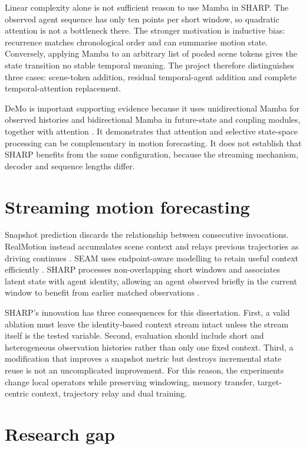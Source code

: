 Linear complexity alone is not sufficient reason to use Mamba in SHARP. The observed agent sequence has only ten points per short window, so quadratic attention is not a bottleneck there. The stronger motivation is inductive bias: recurrence matches chronological order and can summarise motion state. Conversely, applying Mamba to an arbitrary list of pooled scene tokens gives the state transition no stable temporal meaning. The project therefore distinguishes three cases: scene-token addition, residual temporal-agent addition and complete temporal-attention replacement.

DeMo is important supporting evidence because it uses unidirectional Mamba for observed histories and bidirectional Mamba in future-state and coupling modules, together with attention \cite{zhang2024demo}. It demonstrates that attention and selective state-space processing can be complementary in motion forecasting. It does not establish that SHARP benefits from the same configuration, because the streaming mechanism, decoder and sequence lengths differ.

\section{Streaming motion forecasting}

Snapshot prediction discards the relationship between consecutive invocations. RealMotion instead accumulates scene context and relays previous trajectories as driving continues \cite{song2024realmotion}. SEAM uses endpoint-aware modelling to retain useful context efficiently \cite{prutsch2026seam}. SHARP processes non-overlapping short windows and associates latent state with agent identity, allowing an agent observed briefly in the current window to benefit from earlier matched observations \cite{prutsch2026sharp}.

SHARP's innovation has three consequences for this dissertation. First, a valid ablation must leave the identity-based context stream intact unless the stream itself is the tested variable. Second, evaluation should include short and heterogeneous observation histories rather than only one fixed context. Third, a modification that improves a snapshot metric but destroys incremental state reuse is not an uncomplicated improvement. For this reason, the experiments change local operators while preserving windowing, memory transfer, target-centric context, trajectory relay and dual training.

\section{Research gap}

